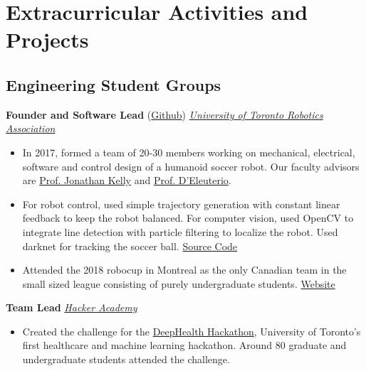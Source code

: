 \documentclass[10pt, a4paper]{cv}
\begin{document}
\section*{Extracurricular Activities and Projects}

\subsection*{Engineering Student Groups}\noindent

	\textbf{Founder and Software Lead} (\href{https://github.com/utra-robosoccer/soccer_ws} {Github}) \hfill \emph{\href{http://www.utrahumanoid.ca}{University of Toronto Robotics Association}}
	\begin{itemize}
		\item In 2017, formed a team of 20-30 members working on mechanical, electrical, software and control design of a humanoid soccer robot. Our faculty advisors are \href{http://stars.utias.utoronto.ca/~jkelly/}{Prof. Jonathan Kelly} and \href{http://www.utias.utoronto.ca/research/space-robotics/}{Prof. D’Eleuterio}.
		\item For robot control, used simple trajectory generation with constant linear feedback to keep the robot balanced. For computer vision, used OpenCV to integrate line detection with particle filtering to localize the robot. Used darknet for tracking the soccer ball. \href{https://github.com/utra-robosoccer/soccer_ws}{Source Code}
		\item Attended the 2018 robocup in Montreal as the only Canadian team in the small sized league consisting of purely undergraduate students. \href{http://utrahumanoid.ca}{Website}
	\end{itemize}
	
	\textbf{Team Lead} \hfill \emph{\href{http://hackeracademy.org}{Hacker Academy}}
	\begin{itemize}
		\item Created the challenge for the \href{https://www.facebook.com/groups/1126158850825448/}{DeepHealth Hackathon}, University of Toronto's first healthcare and machine learning hackathon. Around 80 graduate and undergraduate students attended the challenge.
	\end{itemize}
\end{document}
